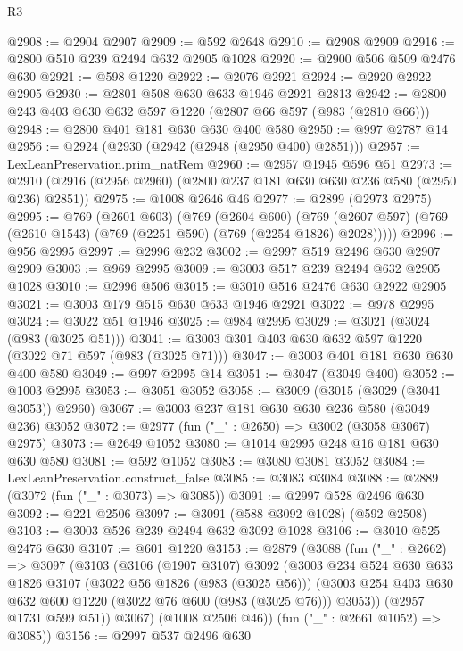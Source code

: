 \begin{lexlean}{R3}
\begin{coremodule}
@2908 := @2904 @2907
@2909 := @592 @2648
@2910 := @2908 @2909
@2916 := @2800 @510 @239 @2494 @632 @2905 @1028
@2920 := @2900 @506 @509 @2476 @630
@2921 := @598 @1220
@2922 := @2076 @2921
@2924 := @2920 @2922 @2905
@2930 := @2801 @508 @630 @633 @1946 @2921 @2813
@2942 := @2800 @243 @403 @630 @632 @597 @1220 (@2807 @66 @597 (@983 (@2810 @66)))
@2948 := @2800 @401 @181 @630 @630 @400 @580
@2950 := @997 @2787 @14
@2956 := @2924 (@2930 (@2942 (@2948 (@2950 @400) @2851)))
@2957 := LexLeanPreservation.prim_natRem
@2960 := @2957 @1945 @596 @51
@2973 := @2910 (@2916 (@2956 @2960) (@2800 @237 @181 @630 @630 @236 @580 (@2950 @236) @2851))
@2975 := @1008 @2646 @46
@2977 := @2899 (@2973 @2975)
@2995 := @769
    (@2601 @603)
    (@769
      (@2604 @600)
      (@769 (@2607 @597) (@769 (@2610 @1543) (@769 (@2251 @590) (@769 (@2254 @1826) @2028)))))
@2996 := @956 @2995
@2997 := @2996 @232
@3002 := @2997 @519 @2496 @630 @2907 @2909
@3003 := @969 @2995
@3009 := @3003 @517 @239 @2494 @632 @2905 @1028
@3010 := @2996 @506
@3015 := @3010 @516 @2476 @630 @2922 @2905
@3021 := @3003 @179 @515 @630 @633 @1946 @2921
@3022 := @978 @2995
@3024 := @3022 @51 @1946
@3025 := @984 @2995
@3029 := @3021 (@3024 (@983 (@3025 @51)))
@3041 := @3003 @301 @403 @630 @632 @597 @1220 (@3022 @71 @597 (@983 (@3025 @71)))
@3047 := @3003 @401 @181 @630 @630 @400 @580
@3049 := @997 @2995 @14
@3051 := @3047 (@3049 @400)
@3052 := @1003 @2995
@3053 := @3051 @3052
@3058 := @3009 (@3015 (@3029 (@3041 @3053)) @2960)
@3067 := @3003 @237 @181 @630 @630 @236 @580 (@3049 @236) @3052
@3072 := @2977 (fun ("_" : @2650) => @3002 (@3058 @3067) @2975)
@3073 := @2649 @1052
@3080 := @1014 @2995 @248 @16 @181 @630 @630 @580
@3081 := @592 @1052
@3083 := @3080 @3081 @3052
@3084 := LexLeanPreservation.construct_false
@3085 := @3083 @3084
@3088 := @2889 (@3072 (fun ("_" : @3073) => @3085))
@3091 := @2997 @528 @2496 @630
@3092 := @221 @2506
@3097 := @3091 (@588 @3092 @1028) (@592 @2508)
@3103 := @3003 @526 @239 @2494 @632 @3092 @1028
@3106 := @3010 @525 @2476 @630
@3107 := @601 @1220
@3153 := @2879
    (@3088
      (fun ("_" : @2662) =>
      @3097
        (@3103
          (@3106
            (@1907 @3107)
            @3092
            (@3003
              @234
              @524
              @630
              @633
              @1826
              @3107
              (@3022 @56 @1826 (@983 (@3025 @56)))
              (@3003 @254 @403 @630 @632 @600 @1220 (@3022 @76 @600 (@983 (@3025 @76))) @3053))
            (@2957 @1731 @599 @51))
          @3067)
        (@1008 @2506 @46))
      (fun ("_" : @2661 @1052) => @3085))
@3156 := @2997 @537 @2496 @630

\end{coremodule}
\end{lexlean}
